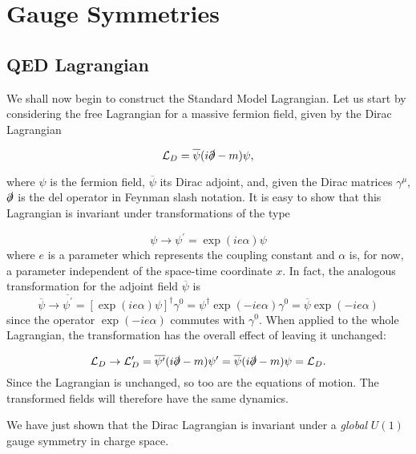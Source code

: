 \documentclass[10pt,a4paper]{book}
\begin{document}
\section{Gauge Symmetries}
\subsection{QED Lagrangian}
We shall now begin to construct the Standard Model Lagrangian. Let us start by considering the free Lagrangian for a massive fermion field, given by the Dirac Lagrangian

\begin{equation}
\mathcal{L}_D = \overline{\psi}(i\slashed{\partial} - m )\psi,
\label{Dirac lagrangian}
\end{equation}

where $\psi$ is the fermion field, $\overline{\psi}$ its Dirac adjoint, and, given the Dirac matrices $\gamma^\mu$, $\slashed{\partial}$ is the del operator in Feynman slash notation.  It is easy to show that this Lagrangian is invariant under transformations of the type

\begin{equation}
\psi \rightarrow \psi^\prime = \exp(ie\alpha)\psi
\label{global gauge symmetry}
\end{equation}
where $e$ is a parameter which represents the coupling constant and $\alpha$ is, for now, a parameter independent of the space-time coordinate $x$.
In fact, the analogous transformation for the adjoint field $\overline{\psi}$ is
\begin{equation}
\overline{\psi} \rightarrow \overline{\psi^\prime} = [\exp(ie\alpha)\psi]^\dagger \gamma^0 = \psi^\dagger \exp(-ie\alpha) \gamma^0 = \overline{\psi}\exp(-ie\alpha)
\end{equation}
since the operator $\exp(-ie\alpha)$ commutes with $\gamma^0$. When applied to the whole Lagrangian, the transformation has the overall effect of leaving it unchanged:

\begin{equation}
\mathcal{L}_D \rightarrow \mathcal{L}^\prime_D= \overline{\psi^\prime}(i\slashed{\partial} - m)\psi^\prime = \overline{\psi}(i\slashed{\partial} - m )\psi = \mathcal{L}_D.
\end{equation}
Since the Lagrangian is unchanged, so too are the equations of motion. The transformed fields will therefore have the same dynamics. 

We have just shown that the Dirac Lagrangian is invariant under a \emph{global} $U(1)$ gauge symmetry in charge space. 
\end{document}
